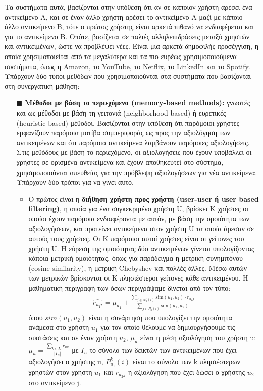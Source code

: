\noindent Τα συστήματα αυτά, βασίζονται στην υπόθεση ότι αν σε κάποιον χρήστη αρέσει ένα αντικείμενο Α, και σε έναν άλλο χρήστη αρέσει το αντικείμενο Α μαζί με κάποιο άλλο αντικείμενο Β, τότε ο πρώτος χρήστης είναι αρκετά πιθανό να ενδιαφέρεται και για το αντικείμενο Β. Οπότε, βασίζεται σε παλιές αλληλεπιδράσεις μεταξύ χρηστών και αντικειμένων, ώστε να προβλέψει νέες. Είναι μια αρκετά δημοφιλής προσέγγιση, η οποία χρησιμοποιείται από τα μεγαλύτερα και τα πιο ευρέως χρησιμοποιούμενα συστήματα, όπως η Αmazon, το YouTube, το Netflix, το LinkedIn και το Spotify. Υπάρχουν δύο τύποι μεθόδων που χρησιμοποιούνται στα συστήματα που βασίζονται στη συνεργατική μάθηση:
\begin{itemize}
	\item[$\blacksquare$] 	\textbf{Μέθοδοι με βάση το περιεχόμενο (memory-based methods):} γνωστές και ως μέθοδοι με βάση τη γειτονιά (neighborhood-based) ή ευρετικές (heuristic-based) μέθοδοι. Βασίζονται στην υπόθεση ότι παρόμοιοι χρήστες εμφανίζουν παρόμοια μοτίβα συμπεριφοράς ως προς την αξιολόγηση των αντικειμένων και ότι παρόμοια αντικείμενα λαμβάνουν παρόμοιες αξιολογήσεις. Στις μεθόδους με βάση το περιεχόμενο, οι αξιολογήσεις που έχουν υποβάλλει οι χρήστες σε ορισμένα αντικείμενα και έχουν αποθηκευτεί στο σύστημα, χρησιμοποιούνται απευθείας για την πρόβλεψη αξιολογήσεων για νέα αντικείμενα. Υπάρχουν δύο τρόποι για να γίνει αυτό.
	\begin{itemize}
		\item
		Ο πρώτος είναι η\textbf{ διήθηση χρήστη προς χρήστη (user-user ή user based filtering)}\cite{resnickGroupLensOpenArchitecture1994}, η οποία για ένα συγκεκριμένο χρήστη U, βρίσκει K χρήστες οι οποίοι έχουν παρόμοια ενδιαφέροντα με αυτόν, με βάση την ομοιότητα των αξιολογήσεων, και προτείνει αντικείμενα στον χρήστη U τα οποία άρεσαν σε αυτούς τους χρήστες. Οι K παρόμοιοι αυτοί χρήστες είναι οι γείτονες του χρήστη U. Η εύρεση της ομοιότητας δύο αντικειμένων γίνεται υπολογίζοντας κάποια μετρική ομοιότητας, όπως για παράδειγμα η μετρική συνημιτόνου (cosine similarity), η μετρική Chebyshev και πολλές άλλες. Μέσω αυτών των μετρικών βρίσκονται οι K πλησιέστεροι γείτονες κάθε αντικειμένου. Η μαθηματική περιγραφή των όσων περιγράψαμε δίνεται από τον τύπο:
		\begin{align}
			\widehat{r_{u_{1}i}}= μ_{u_1} + \frac{\sum_{j\in N_u^k\left(i\right)}\mathrm{sim}\left(u_1,u_2\right)\cdot r_{u_2j}}{\sum_{j\in P_u^k\left(i\right)}\mathrm{sim}\left(u_1,u_2\right)}
		\end{align}
	 όπου $ sim\left(u_1,u_2\right)  $ είναι η συνάρτηση που υπολογίζει την ομοιότητα ανάμεσα στο χρήστη $ u_1 $ για τον οποίο θέλουμε να δημιουργήσουμε τις συστάσεις και σε έναν χρήστη $ u_2 $, $ μ_u $ είναι η μέση αξιολόγηση του χρήστη u: $ μ_u = \frac{\sum_{k \in I_{u}}r_{uk}}{|I_{u}|} $ με $ I_{u} $ το σύνολο των δεικτών των αντικειμένων που έχει αξιολογήσει ο χρήστης u, $ P_{u_1}^k\left(i\right) $ είναι το σύνολο των k πλησιέστερων χρηστών στον χρήστη $ u_1 $  και $r_{u_2j} $ η αξιολόγηση που έχει δώσει ο χρήστης  $ u_2 $ στο αντικείμενο j.

\end{itemize}
\end{itemize}
